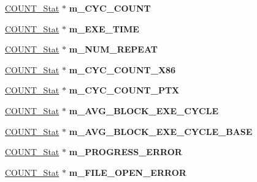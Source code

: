 \begin{DoxyCompactItemize}
\item 
\hypertarget{classall__stats__c_afa7072ad6a51ee4ae36f8d6bcde26849}{
\hyperlink{classCOUNT__Stat}{COUNT\_\-Stat} $\ast$ {\bfseries m\_\-CYC\_\-COUNT}}
\label{classall__stats__c_afa7072ad6a51ee4ae36f8d6bcde26849}

\item 
\hypertarget{classall__stats__c_a8b7742502104981627a4b4478179b729}{
\hyperlink{classCOUNT__Stat}{COUNT\_\-Stat} $\ast$ {\bfseries m\_\-EXE\_\-TIME}}
\label{classall__stats__c_a8b7742502104981627a4b4478179b729}

\item 
\hypertarget{classall__stats__c_a9d5828141fc885761b53be9791c243b8}{
\hyperlink{classCOUNT__Stat}{COUNT\_\-Stat} $\ast$ {\bfseries m\_\-NUM\_\-REPEAT}}
\label{classall__stats__c_a9d5828141fc885761b53be9791c243b8}

\item 
\hypertarget{classall__stats__c_ae11e255f39da50f70ee627bb407533fc}{
\hyperlink{classCOUNT__Stat}{COUNT\_\-Stat} $\ast$ {\bfseries m\_\-CYC\_\-COUNT\_\-X86}}
\label{classall__stats__c_ae11e255f39da50f70ee627bb407533fc}

\item 
\hypertarget{classall__stats__c_a95d3890b0ad4d95d08942dc824aa4da4}{
\hyperlink{classCOUNT__Stat}{COUNT\_\-Stat} $\ast$ {\bfseries m\_\-CYC\_\-COUNT\_\-PTX}}
\label{classall__stats__c_a95d3890b0ad4d95d08942dc824aa4da4}

\item 
\hypertarget{classall__stats__c_a8f4948fe37cf19f7a10b337eefff58b9}{
\hyperlink{classCOUNT__Stat}{COUNT\_\-Stat} $\ast$ {\bfseries m\_\-AVG\_\-BLOCK\_\-EXE\_\-CYCLE}}
\label{classall__stats__c_a8f4948fe37cf19f7a10b337eefff58b9}

\item 
\hypertarget{classall__stats__c_ab7eaf0c59c6dc55058377e96da8a2310}{
\hyperlink{classCOUNT__Stat}{COUNT\_\-Stat} $\ast$ {\bfseries m\_\-AVG\_\-BLOCK\_\-EXE\_\-CYCLE\_\-BASE}}
\label{classall__stats__c_ab7eaf0c59c6dc55058377e96da8a2310}

\item 
\hypertarget{classall__stats__c_a359635ce9b890a63fe6d7c121f216a5d}{
\hyperlink{classCOUNT__Stat}{COUNT\_\-Stat} $\ast$ {\bfseries m\_\-PROGRESS\_\-ERROR}}
\label{classall__stats__c_a359635ce9b890a63fe6d7c121f216a5d}

\item 
\hypertarget{classall__stats__c_adc867de6fa404551f62fb495097e668f}{
\hyperlink{classCOUNT__Stat}{COUNT\_\-Stat} $\ast$ {\bfseries m\_\-FILE\_\-OPEN\_\-ERROR}}
\label{classall__stats__c_adc867de6fa404551f62fb495097e668f}


\end{DoxyCompactItemize}
